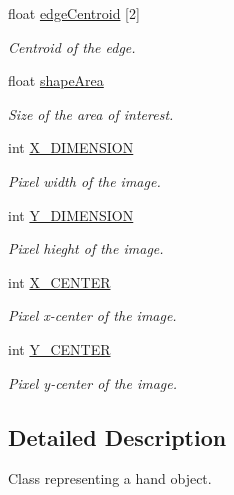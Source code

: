 \begin{DoxyCompactItemize}
float \hyperlink{class_hand_a44e1328fa33595d1d81e0aaa6109cb6d}{edge\+Centroid} \mbox{[}2\mbox{]}
\begin{DoxyCompactList}\small\item\em Centroid of the edge. \end{DoxyCompactList}\item 
float \hyperlink{class_hand_a505288f2ffe79800bcb8b5ccb4f1995a}{shape\+Area}
\begin{DoxyCompactList}\small\item\em Size of the area of interest. \end{DoxyCompactList}\item 
int \hyperlink{class_hand_a406c0335ce812fd226df4678e3322558}{X\+\_\+\+D\+I\+M\+E\+N\+S\+I\+ON}
\begin{DoxyCompactList}\small\item\em Pixel width of the image. \end{DoxyCompactList}\item 
int \hyperlink{class_hand_a7d6177d54f9bf9b7e6c0e0d8aff5f935}{Y\+\_\+\+D\+I\+M\+E\+N\+S\+I\+ON}
\begin{DoxyCompactList}\small\item\em Pixel hieght of the image. \end{DoxyCompactList}\item 
int \hyperlink{class_hand_aee740c8161bd4bdd1f8f77a6d52dc65e}{X\+\_\+\+C\+E\+N\+T\+ER}
\begin{DoxyCompactList}\small\item\em Pixel x-\/center of the image. \end{DoxyCompactList}\item 
int \hyperlink{class_hand_ab213d81fcf0ed7086ba82540824c3fd9}{Y\+\_\+\+C\+E\+N\+T\+ER}
\begin{DoxyCompactList}\small\item\em Pixel y-\/center of the image. \end{DoxyCompactList}\end{DoxyCompactItemize}


\subsection{Detailed Description}
Class representing a hand object. 

